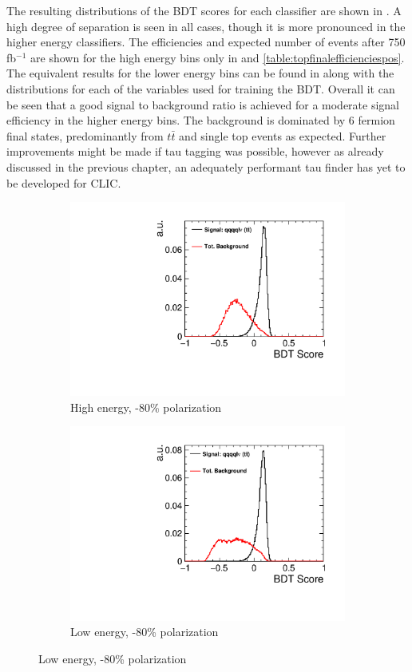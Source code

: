 The resulting distributions of the \ac{BDT} scores for each classifier are shown in . A high degree of separation is seen in all cases, though it is more pronounced in the higher energy classifiers. The efficiencies and expected number of events after 750 fb$^{-1}$ are shown for the high energy bins only in  and \ref{table:topfinalefficienciespos}. The equivalent results for the lower energy bins can be found in  along with the distributions for each of the variables used for training the \ac{BDT}. Overall it can be seen that a good signal to background ratio is achieved for a moderate signal efficiency in the higher energy bins. The background is dominated by 6 fermion final states, predominantly from $t\bar{t}$ and single top events as expected. Further improvements might be made if tau tagging was possible, however as already discussed in the previous chapter, an adequately performant tau finder has yet to be developed for \ac{CLIC}. 

\begin{figure}[ht] 
  \begin{subfigure}[b]{0.5\linewidth}
    \centering
    \includegraphics[width=0.75\linewidth]{TopAnalysis/figures/BDTScoreHighENeg.pdf} 
    \caption{High energy, -80\% polarization} 
    \vspace{4ex}
  \end{subfigure}%
  \begin{subfigure}[b]{0.5\linewidth}
    \centering
    \includegraphics[width=0.75\linewidth]{TopAnalysis/figures/BDTScoreLowENeg.pdf} 
    \caption{Low energy, -80\% polarization} 
    \vspace{4ex}
  \end{subfigure} 
\end{figure}

